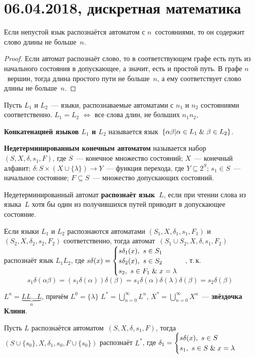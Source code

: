 \chapter{06.04.2018, дискретная математика}
\begin{statement}
Если непустой язык распознаётся автоматом с $n$~состояниями, то он содержит слово длины не больше~$n$.
\end{statement}
\begin{proof}
Если автомат распознаёт слово, то в соответствующем графе есть путь из начального состояния в допускающее, а значит, есть и простой путь.
В графе $n$~вершин, тогда длина простого пути не больше~$n$, а ему соответствует слово длины не больше~$n$.
\end{proof}

\begin{statement}
Пусть $L_1$ и $L_2$~--- языки, распознаваемые автоматами с $n_1$ и $n_2$ состояниями соответственно.
$L_1 = L_2$ $\Leftrightarrow$ все слова длин, не больших $n_1 n_2$, 
\end{statement}

\textbf{Конкатенацией языков $L_1$ и $L_2$} называется язык~$\{ \alpha \beta | \alpha \in L_1 \mathrel{\&} \beta \in L_2 \}$.

\textbf{Недетерминированным конечным автоматом} называется набор~$(S, X, \delta, s_1, F)$, где
$S$~--- конечное множество состояний;
$X$~--- конечный алфавит;
$\delta \colon S \times (X \cup \{ \lambda \}) \to Y$~--- функция перехода, где $Y \subseteq 2^S$;
$s_1 \in S$~--- начальное состояние;
$F \subseteq S$~--- множество допускающих состояний.

Недетерминированный автомат \textbf{распознаёт язык~$L$}, если при чтении слова из языка~$L$ хотя бы один из получившихся путей приводит в допускающее состояние.

Если языки $L_1$ и $L_2$ распознаются автоматами $(S_1, X, \delta_1, s_1, F_1)$ и $(S_2, X, \delta_2, s_2, F_2)$ соответственно, тогда автомат~$(S_1 \cup S_2, X, \delta, s_1, F_2)$ распознаёт язык $L_1 L_2$, где
$s \delta(x) =
\begin{cases}
s \delta_1(x), \ s \in S_1 \\
s \delta_2(x), \ s \in S_2 \\
s_2, \ s \in F_1 \mathrel{\&} x = \lambda
\end{cases}$, т.\,к.
\begin{equation*}
s_1 \delta(\alpha \beta) =
(s_1 \delta(\alpha)) \delta(\beta) =
s_1 \delta(\alpha) \delta(\lambda) \delta(\beta) =
s_2 \delta(\beta)
\end{equation*}

$L^n = \underbrace{L L \ldots L}_n$, причём $L^0 = \{ \lambda \}$
$L^* = \bigcup\limits_{n=0}^\infty L^n$, $X^* = \bigcup\limits_{n=0}^\infty X^n$~--- \textbf{звёздочка Клини}.

Пусть $L$ распознаётся автоматом~$(S, X, \delta, s_1, F)$, тогда $(S \cup \{ s_0 \}, X, \delta_1, s_0, F \cup \{ s_0 \})$ распознаёт $L^*$, где
$\delta_1 =
\begin{cases}
s \delta(x), \ s \in S \\
s_1, \ s \in S \mathrel{\&} x = \lambda
\end{cases}$